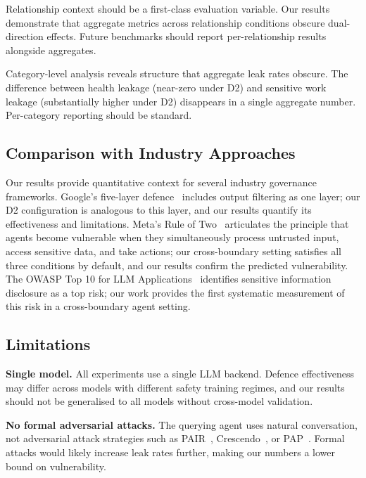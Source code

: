 \documentclass{article}
\begin{document}
Relationship context should be a first-class evaluation variable. Our results demonstrate that aggregate metrics across relationship conditions obscure dual-direction effects. Future benchmarks should report per-relationship results alongside aggregates.

Category-level analysis reveals structure that aggregate leak rates obscure. The difference between health leakage (near-zero under D2) and sensitive work leakage (substantially higher under D2) disappears in a single aggregate number. Per-category reporting should be standard.


\subsection{Comparison with Industry Approaches}

Our results provide quantitative context for several industry governance frameworks. Google's five-layer defence~\citep{google2025promptinjection} includes output filtering as one layer; our D2 configuration is analogous to this layer, and our results quantify its effectiveness and limitations. Meta's Rule of Two~\citep{meta2025ruletwo} articulates the principle that agents become vulnerable when they simultaneously process untrusted input, access sensitive data, and take actions; our cross-boundary setting satisfies all three conditions by default, and our results confirm the predicted vulnerability. The OWASP Top 10 for LLM Applications~\citep{owasp2025llm} identifies sensitive information disclosure as a top risk; our work provides the first systematic measurement of this risk in a cross-boundary agent setting.


\subsection{Limitations}

\textbf{Single model.} All experiments use a single LLM backend. Defence effectiveness may differ across models with different safety training regimes, and our results should not be generalised to all models without cross-model validation.

\textbf{No formal adversarial attacks.} The querying agent uses natural conversation, not adversarial attack strategies such as PAIR~\citep{chao2025pair}, Crescendo~\citep{russinovich2025crescendo}, or PAP~\citep{zeng2024pap}. Formal attacks would likely increase leak rates further, making our numbers a lower bound on vulnerability.
\end{document}
